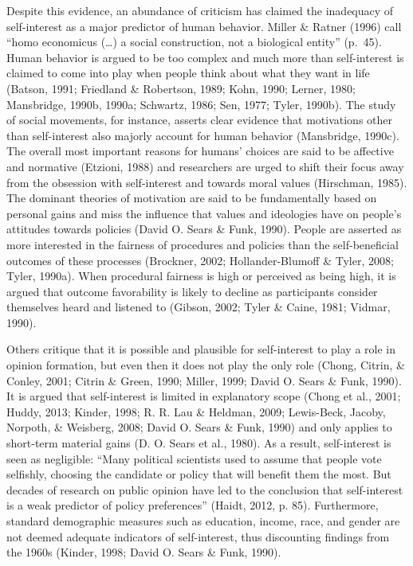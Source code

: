 \documentclass[12pt,econ]{sources/authesis}
\begin{document}
Despite this evidence, an abundance of criticism has claimed the inadequacy of self-interest as a major predictor of human behavior. Miller \& Ratner (1996) call ``homo economicus (\ldots) a social construction, not a biological entity'' (p.~45). Human behavior is argued to be too complex and much more than self-interest is claimed to come into play when people think about what they want in life (Batson, 1991; Friedland \& Robertson, 1989; Kohn, 1990; Lerner, 1980; Mansbridge, 1990b, 1990a; Schwartz, 1986; Sen, 1977; Tyler, 1990b). The study of social movements, for instance, asserts clear evidence that motivations other than self-interest also majorly account for human behavior (Mansbridge, 1990c). The overall most important reasons for humans' choices are said to be affective and normative (Etzioni, 1988) and researchers are urged to shift their focus away from the obsession with self-interest and towards moral values (Hirschman, 1985). The dominant theories of motivation are said to be fundamentally based on personal gains and miss the influence that values and ideologies have on people's attitudes towards policies (David O. Sears \& Funk, 1990). People are asserted as more interested in the fairness of procedures and policies than the self-beneficial outcomes of these processes (Brockner, 2002; Hollander-Blumoff \& Tyler, 2008; Tyler, 1990a). When procedural fairness is high or perceived as being high, it is argued that outcome favorability is likely to decline as participants consider themselves heard and listened to (Gibson, 2002; Tyler \& Caine, 1981; Vidmar, 1990).

Others critique that it is possible and plausible for self-interest to play a role in opinion formation, but even then it does not play the only role (Chong, Citrin, \& Conley, 2001; Citrin \& Green, 1990; Miller, 1999; David O. Sears \& Funk, 1990). It is argued that self-interest is limited in explanatory scope (Chong et al., 2001; Huddy, 2013; Kinder, 1998; R. R. Lau \& Heldman, 2009; Lewis-Beck, Jacoby, Norpoth, \& Weisberg, 2008; David O. Sears \& Funk, 1990) and only applies to short-term material gains (D. O. Sears et al., 1980). As a result, self-interest is seen as negligible: ``Many political scientists used to assume that people vote selfishly, choosing the candidate or policy that will benefit them the most. But decades of research on public opinion have led to the conclusion that self-interest is a weak predictor of policy preferences'' (Haidt, 2012, p. 85). Furthermore, standard demographic measures such as education, income, race, and gender are not deemed adequate indicators of self-interest, thus discounting findings from the 1960s (Kinder, 1998; David O. Sears \& Funk, 1990).
\end{document}
